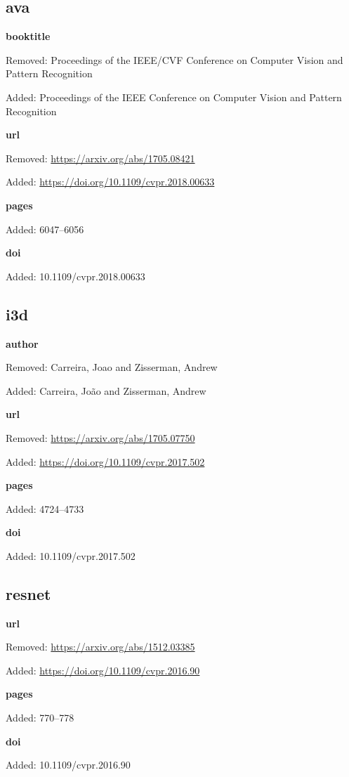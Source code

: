 \subsection*{ava}
\noindent\textbf{booktitle}\par
{\color{AuditRed}Removed: Proceedings of the IEEE/CVF Conference on Computer Vision and Pattern Recognition\par}
{\color{AuditGreen}Added: Proceedings of the IEEE Conference on Computer Vision and Pattern Recognition\par}
\noindent\textbf{url}\par
{\color{AuditRed}Removed: \url{https://arxiv.org/abs/1705.08421}\par}
{\color{AuditGreen}Added: \url{https://doi.org/10.1109/cvpr.2018.00633}\par}
\noindent\textbf{pages}\par
{\color{AuditGreen}Added: 6047–6056\par}
\noindent\textbf{doi}\par
{\color{AuditGreen}Added: 10.1109/cvpr.2018.00633\par}
\medskip

\subsection*{i3d}
\noindent\textbf{author}\par
{\color{AuditRed}Removed: Carreira, Joao and Zisserman, Andrew\par}
{\color{AuditGreen}Added: Carreira, João and Zisserman, Andrew\par}
\noindent\textbf{url}\par
{\color{AuditRed}Removed: \url{https://arxiv.org/abs/1705.07750}\par}
{\color{AuditGreen}Added: \url{https://doi.org/10.1109/cvpr.2017.502}\par}
\noindent\textbf{pages}\par
{\color{AuditGreen}Added: 4724–4733\par}
\noindent\textbf{doi}\par
{\color{AuditGreen}Added: 10.1109/cvpr.2017.502\par}
\medskip

\subsection*{resnet}
\noindent\textbf{url}\par
{\color{AuditRed}Removed: \url{https://arxiv.org/abs/1512.03385}\par}
{\color{AuditGreen}Added: \url{https://doi.org/10.1109/cvpr.2016.90}\par}
\noindent\textbf{pages}\par
{\color{AuditGreen}Added: 770–778\par}
\noindent\textbf{doi}\par
{\color{AuditGreen}Added: 10.1109/cvpr.2016.90\par}
\medskip

